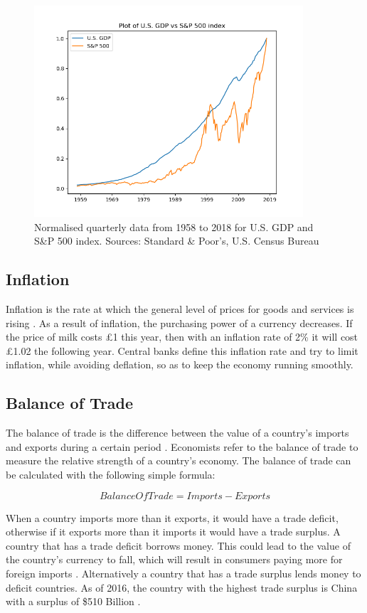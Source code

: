 \documentclass{UoYCSproject}
\begin{document}
\begin{figure}[h]
\includegraphics[width=10cm]{GDPvsSP500}
\centering
\caption{Normalised quarterly data from 1958 to 2018 for U.S. GDP and S\&P 500 index. Sources: Standard \& Poor's, U.S. Census Bureau} 
\label{fig:gdpvssp500}
\end{figure}

\subsection{Inflation}
Inflation is the rate at which the general level of prices for goods and services is rising \cite{inflation}. As a result of inflation, the purchasing power of a currency decreases. If the price of milk costs \pounds 1 this year, then with an inflation rate of 2\% it will cost \pounds 1.02 the following year. Central banks define this inflation rate and try to limit inflation, while avoiding deflation, so as to keep the economy running smoothly.    

\subsection{Balance of Trade}
The balance of trade is the difference between the value of a country's imports and exports during a certain period \cite{balanceoftrade}. Economists refer to the balance of trade to measure the relative strength of a country's economy. The balance of trade can be calculated with the following simple formula:

\begin{equation}
    Balance Of Trade = Imports - Exports
\end{equation}

When a country imports more than it exports, it would have a trade deficit, otherwise if it exports more than it imports it would have a trade surplus. A country that has a trade deficit borrows money. This could lead to the value of the country's currency to fall, which will result in consumers paying more for foreign imports \cite{2003economics}. Alternatively a country that has a trade surplus lends money to deficit countries. As of 2016, the country with the highest trade surplus is China with a surplus of \$510 Billion \cite{tradesurplus}.   
\end{document}
